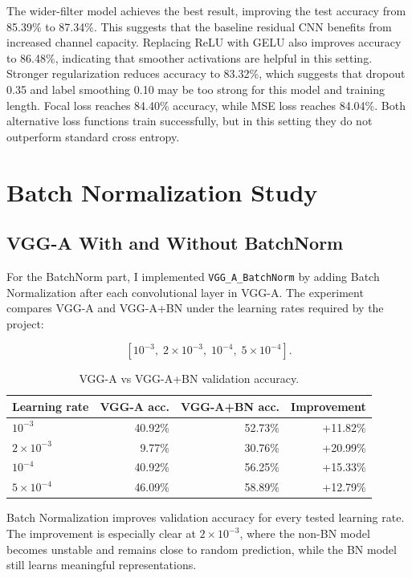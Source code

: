 \documentclass[12pt]{article}
\begin{document}
The wider-filter model achieves the best result, improving the test accuracy from 85.39\% to 87.34\%. This suggests that the baseline residual CNN benefits from increased channel capacity. Replacing ReLU with GELU also improves accuracy to 86.48\%, indicating that smoother activations are helpful in this setting. Stronger regularization reduces accuracy to 83.32\%, which suggests that dropout 0.35 and label smoothing 0.10 may be too strong for this model and training length. Focal loss reaches 84.40\% accuracy, while MSE loss reaches 84.04\%. Both alternative loss functions train successfully, but in this setting they do not outperform standard cross entropy.

\section{Batch Normalization Study}

\subsection{VGG-A With and Without BatchNorm}

For the BatchNorm part, I implemented \texttt{VGG\_A\_BatchNorm} by adding Batch Normalization after each convolutional layer in VGG-A. The experiment compares VGG-A and VGG-A+BN under the learning rates required by the project:

\[
[10^{-3},\;2\times10^{-3},\;10^{-4},\;5\times10^{-4}].
\]

\begin{table}[H]
\centering
\caption{VGG-A vs VGG-A+BN validation accuracy.}
\begin{tabular}{lrrr}
\toprule
Learning rate & VGG-A acc. & VGG-A+BN acc. & Improvement \\
\midrule
$10^{-3}$ & 40.92\% & 52.73\% & +11.82\% \\
$2\times10^{-3}$ & 9.77\% & 30.76\% & +20.99\% \\
$10^{-4}$ & 40.92\% & 56.25\% & +15.33\% \\
$5\times10^{-4}$ & 46.09\% & 58.89\% & +12.79\% \\
\bottomrule
\end{tabular}
\end{table}

Batch Normalization improves validation accuracy for every tested learning rate. The improvement is especially clear at $2\times10^{-3}$, where the non-BN model becomes unstable and remains close to random prediction, while the BN model still learns meaningful representations.
\end{document}
